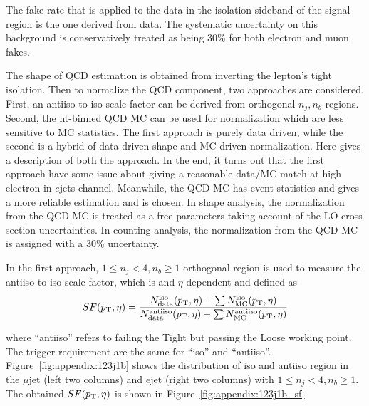 The fake rate that is applied to the data in the isolation sideband of the signal region is the one derived from data.  The systematic uncertainty on this background is conservatively treated as being 30\% for both electron and muon fakes.  





The shape of QCD estimation is obtained from inverting the lepton's tight isolation. Then to normalize the QCD component, two approaches are considered. First, an antiiso-to-iso scale factor can be derived from orthogonal $n_j,n_b$ regions. Second, the ht-binned QCD MC can be used for normalization which are less sensitive to MC statistics. The first approach is purely data driven, while the second is a hybrid of data-driven shape and MC-driven normalization. Here gives a description of both the approach. In the end, it turns out that the first approach have some issue about giving a reasonable data/MC match at high electron \pt in $e$jets channel. Meanwhile, the QCD MC has event statistics and gives a more reliable estimation and is chosen. In shape analysis, the normalization from the QCD MC is treated as a free parameters taking account of the LO cross section uncertainties. In counting analysis, the normalization from the QCD MC is assigned with a 30\% uncertainty.

In the first approach, $1\leq n_j<4,n_b\geq1$ orthogonal region is used to measure the antiiso-to-iso scale factor, which is \pt and $\eta$ dependent and defined as
\begin{equation}
SF (p_{\mathrm{T}}, \eta) =  \frac{N^{\rm{iso}}_{\rm{data}} (p_{\mathrm{T}}, \eta) - \sum N^{\rm{iso}}_{\rm{MC}}(p_{\mathrm{T}}, \eta) } 
{N^{\rm{antiiso}}_{\rm{data}} (p_{\mathrm{T}}, \eta)- \sum N^{\rm{antiiso}}_{\rm{MC}}(p_{\mathrm{T}}, \eta) }
\end{equation}

\noindent where ``antiiso'' refers to failing the Tight but passing the Loose working point. The trigger requirement are the same for ``iso'' and ``antiiso''. Figure~\ref{fig:appendix:123j1b} shows the distribution of iso and antiiso region in the $\mu$jet (left two columns) and $e$jet (right two columns) with $1\leq n_j<4,n_b\geq1$. The obtained $SF (p_{\mathrm{T}}, \eta)$ is shown in Figure~\ref{fig:appendix:123j1b_sf}.

